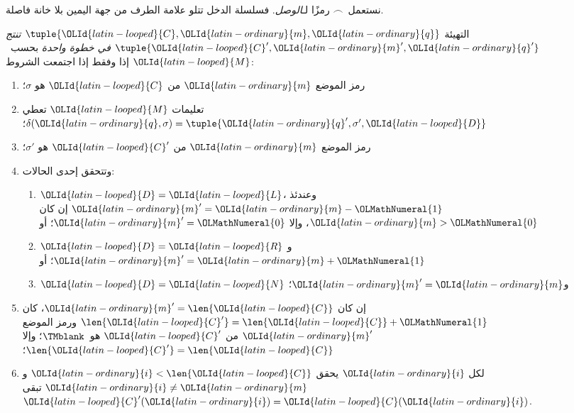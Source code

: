 \documentclass[../../../include/open-logic-section]{subfiles}
\begin{document}
\begin{explain}
نستعمل~$\frown$ رمزًا لـ\emph{الوصل}. فسلسلة الدخل تتلو علامة الطرف من جهة اليمين بلا خانة فاصلة.
\end{explain}

\begin{defn}
التهيئة $\tuple{{\OLId{latin-looped}{C}},{\OLId{latin-ordinary}{m}},{\OLId{latin-ordinary}{q}}}$ \emph{تنتج $\tuple{{\OLId{latin-looped}{C}}',{\OLId{latin-ordinary}{m}}',{\OLId{latin-ordinary}{q}}'}$ في خطوة واحدة} بحسب~${\OLId{latin-looped}{M}}$ إذا وفقط إذا اجتمعت الشروط:
\begin{enumerate}
\item رمز الموضع ${\OLId{latin-ordinary}{m}}$ من ${\OLId{latin-looped}{C}}$ هو $\sigma$؛
\item تعليمات ${\OLId{latin-looped}{M}}$ تعطي $\delta({\OLId{latin-ordinary}{q}},\sigma)=
  \tuple{{\OLId{latin-ordinary}{q}}',\sigma',{\OLId{latin-looped}{D}}}$؛
\item رمز الموضع ${\OLId{latin-ordinary}{m}}$ من ${\OLId{latin-looped}{C}}'$ هو $\sigma'$؛
\item وتتحقق إحدى الحالات:
\begin{enumerate}
\item ${\OLId{latin-looped}{D}}={\OLId{latin-looped}{L}}$، وعندئذ ${\OLId{latin-ordinary}{m}}'={\OLId{latin-ordinary}{m}}-{\OLMathNumeral{1}}$ إن كان ${\OLId{latin-ordinary}{m}}>{\OLMathNumeral{0}}$، وإلا ${\OLId{latin-ordinary}{m}}'={\OLMathNumeral{0}}$؛ أو
\item ${\OLId{latin-looped}{D}}={\OLId{latin-looped}{R}}$ و${\OLId{latin-ordinary}{m}}'={\OLId{latin-ordinary}{m}}+{\OLMathNumeral{1}}$؛ أو
\item ${\OLId{latin-looped}{D}}={\OLId{latin-looped}{N}}$ و${\OLId{latin-ordinary}{m}}'={\OLId{latin-ordinary}{m}}$؛
\end{enumerate}
\item إن كان ${\OLId{latin-ordinary}{m}}'=\len{{\OLId{latin-looped}{C}}}$، كان $\len{{\OLId{latin-looped}{C}}'}=\len{{\OLId{latin-looped}{C}}}+{\OLMathNumeral{1}}$ ورمز الموضع ${\OLId{latin-ordinary}{m}}'$ من ${\OLId{latin-looped}{C}}'$ هو~$\TMblank$؛ وإلا $\len{{\OLId{latin-looped}{C}}'}=\len{{\OLId{latin-looped}{C}}}$؛
\item لكل ${\OLId{latin-ordinary}{i}}$ يحقق ${\OLId{latin-ordinary}{i}}<\len{{\OLId{latin-looped}{C}}}$ و${\OLId{latin-ordinary}{i}}\neq {\OLId{latin-ordinary}{m}}$ تبقى ${\OLId{latin-looped}{C}}'({\OLId{latin-ordinary}{i}})={\OLId{latin-looped}{C}}({\OLId{latin-ordinary}{i}})$.
\end{enumerate}
\end{defn}
\end{document}
